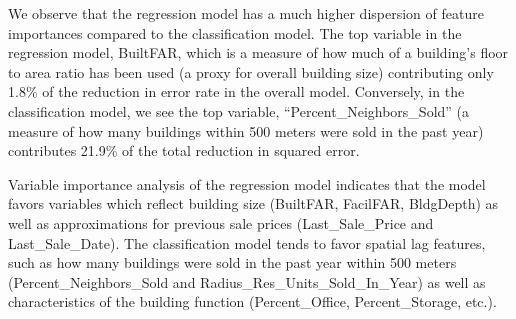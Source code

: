 \documentclass[12pt,]{article}
\begin{document}
\begin{table}

\caption{\label{tab:Class VarImp}\label{tab:ClassVarImp} Feature Importance of Top Performing Classification Model}
\centering
{}
\end{table}

We observe that the regression model has a much higher dispersion of
feature importances compared to the classification model. The top
variable in the regression model, BuiltFAR, which is a measure of how
much of a building's floor to area ratio has been used (a proxy for
overall building size) contributing only 1.8\% of the reduction in error
rate in the overall model. Conversely, in the classification model, we
see the top variable, ``Percent\_Neighbors\_Sold'' (a measure of how
many buildings within 500 meters were sold in the past year) contributes
21.9\% of the total reduction in squared error.

Variable importance analysis of the regression model indicates that the
model favors variables which reflect building size (BuiltFAR, FacilFAR,
BldgDepth) as well as approximations for previous sale prices
(Last\_Sale\_Price and Last\_Sale\_Date). The classification model tends
to favor spatial lag features, such as how many buildings were sold in
the past year within 500 meters (Percent\_Neighbors\_Sold and
Radius\_Res\_Units\_Sold\_In\_Year) as well as characteristics of the
building function (Percent\_Office, Percent\_Storage, etc.).
\end{document}
